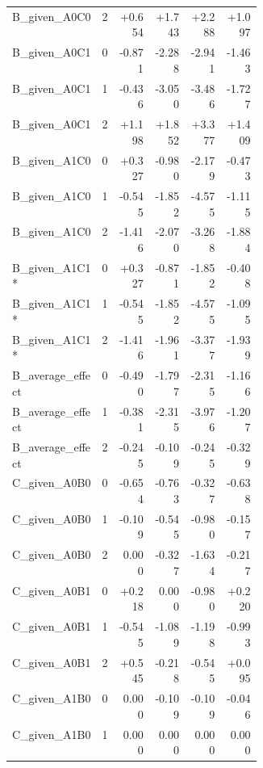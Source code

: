 \begin{longtable}{@{}p{0.36\linewidth}rrrrr@{}}
B\_\allowbreak{}given\_\allowbreak{}A0C0 & 2 & +0.654 & +1.743 & +2.288 & +1.097 \\
B\_\allowbreak{}given\_\allowbreak{}A0C1 & 0 & -0.871 & -2.288 & -2.941 & -1.463 \\
B\_\allowbreak{}given\_\allowbreak{}A0C1 & 1 & -0.436 & -3.050 & -3.486 & -1.727 \\
B\_\allowbreak{}given\_\allowbreak{}A0C1 & 2 & +1.198 & +1.852 & +3.377 & +1.409 \\
B\_\allowbreak{}given\_\allowbreak{}A1C0 & 0 & +0.327 & -0.980 & -2.179 & -0.473 \\
B\_\allowbreak{}given\_\allowbreak{}A1C0 & 1 & -0.545 & -1.852 & -4.575 & -1.115 \\
B\_\allowbreak{}given\_\allowbreak{}A1C0 & 2 & -1.416 & -2.070 & -3.268 & -1.884 \\
B\_\allowbreak{}given\_\allowbreak{}A1C1* & 0 & +0.327 & -0.871 & -1.852 & -0.408 \\
B\_\allowbreak{}given\_\allowbreak{}A1C1* & 1 & -0.545 & -1.852 & -4.575 & -1.095 \\
B\_\allowbreak{}given\_\allowbreak{}A1C1* & 2 & -1.416 & -1.961 & -3.377 & -1.939 \\
B\_\allowbreak{}average\_\allowbreak{}effect & 0 & -0.490 & -1.797 & -2.315 & -1.166 \\
B\_\allowbreak{}average\_\allowbreak{}effect & 1 & -0.381 & -2.315 & -3.976 & -1.207 \\
B\_\allowbreak{}average\_\allowbreak{}effect & 2 & -0.245 & -0.109 & -0.245 & -0.329 \\
C\_\allowbreak{}given\_\allowbreak{}A0B0 & 0 & -0.654 & -0.763 & -0.327 & -0.638 \\
C\_\allowbreak{}given\_\allowbreak{}A0B0 & 1 & -0.109 & -0.545 & -0.980 & -0.157 \\
C\_\allowbreak{}given\_\allowbreak{}A0B0 & 2 & 0.000 & -0.327 & -1.634 & -0.217 \\
C\_\allowbreak{}given\_\allowbreak{}A0B1 & 0 & +0.218 & 0.000 & -0.980 & +0.220 \\
C\_\allowbreak{}given\_\allowbreak{}A0B1 & 1 & -0.545 & -1.089 & -1.198 & -0.993 \\
C\_\allowbreak{}given\_\allowbreak{}A0B1 & 2 & +0.545 & -0.218 & -0.545 & +0.095 \\
C\_\allowbreak{}given\_\allowbreak{}A1B0 & 0 & 0.000 & -0.109 & -0.109 & -0.046 \\
C\_\allowbreak{}given\_\allowbreak{}A1B0 & 1 & 0.000 & 0.000 & 0.000 & 0.000 \\

\end{longtable}
